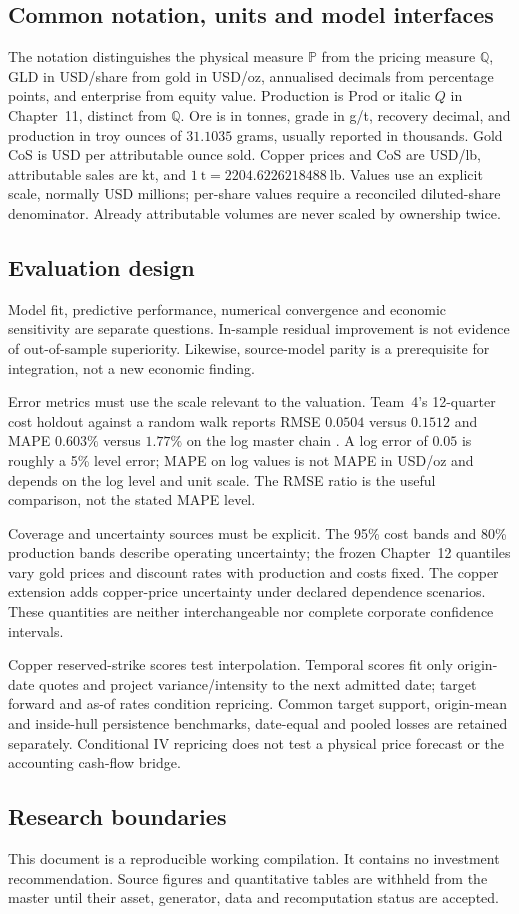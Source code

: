 \subsection{Common notation, units and model interfaces}

The notation distinguishes the physical measure $\mathbb P$ from the pricing
measure $\mathbb Q$, GLD in USD/share from gold in USD/oz, annualised decimals
from percentage points, and enterprise from equity value. Production is
$\mathrm{Prod}$ or italic $Q$ in Chapter~11, distinct from $\mathbb Q$.
Ore is in tonnes, grade in g/t, recovery decimal, and production in troy
ounces of $31.1035$ grams, usually reported in thousands. Gold CoS is USD
per attributable ounce sold. Copper prices and CoS are USD/lb, attributable
sales are kt, and $1~\mathrm{t}=2204.6226218488~\mathrm{lb}$. Values use an
explicit scale, normally USD millions; per-share values require a reconciled
diluted-share denominator. Already attributable volumes are never scaled by
ownership twice.

\subsection{Evaluation design}

Model fit, predictive performance, numerical convergence and economic sensitivity are separate questions. In-sample residual improvement is not evidence of out-of-sample superiority. Likewise, source-model parity is a prerequisite for integration, not a new economic finding.

Error metrics must use the scale relevant to the valuation. Team~4's
12-quarter cost holdout against a random walk reports RMSE $0.0504$ versus
$0.1512$ and MAPE $0.603\%$ versus $1.77\%$ on the log master chain
\cite{team4}. A log error of $0.05$ is roughly a 5\% level error; MAPE on
log values is not MAPE in USD/oz and depends on the log level and unit scale.
The RMSE ratio is the useful comparison, not the stated MAPE level.

Coverage and uncertainty sources must be explicit. The 95\% cost bands and
80\% production bands describe operating uncertainty; the frozen Chapter~12
quantiles vary gold prices and discount rates with production and costs fixed.
The copper extension adds copper-price uncertainty under declared dependence
scenarios. These quantities are neither interchangeable nor complete
corporate confidence intervals.

Copper reserved-strike scores test interpolation. Temporal scores fit only
origin-date quotes and project variance/intensity to the next admitted date;
target forward and as-of rates condition repricing. Common target support,
origin-mean and inside-hull persistence benchmarks, date-equal and pooled
losses are retained separately. Conditional IV repricing does not test a
physical price forecast or the accounting cash-flow bridge.

\subsection{Research boundaries}

This document is a reproducible working compilation. It contains no investment recommendation. Source figures and quantitative tables are withheld from the master until their asset, generator, data and recomputation status are accepted.
